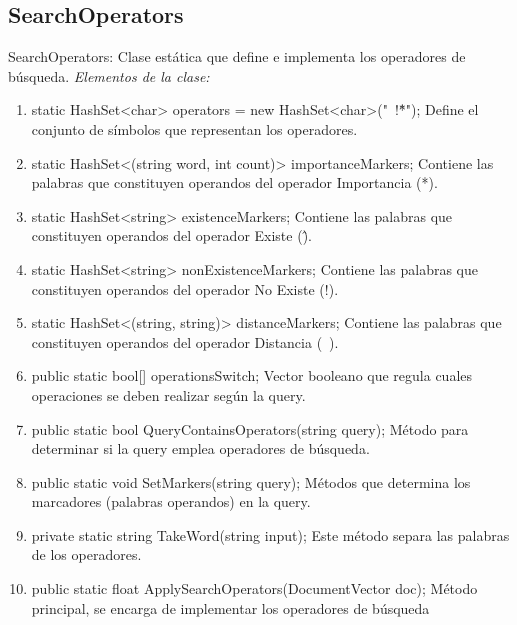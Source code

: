 \documentclass[a4paper,12pt]{article}
\begin{document}
\subsection{SearchOperators}
SearchOperators: Clase estática que define e implementa los operadores de
búsqueda.
\emph{Elementos de la clase:}
\begin{enumerate}
    \item static HashSet<char> operators = new HashSet<char>("~!\^*");
    Define el conjunto de símbolos que representan los operadores.
    \item static HashSet<(string word, int count)> importanceMarkers;
    Contiene las palabras que constituyen operandos del operador Importancia (*).
    \item static HashSet<string> existenceMarkers;
    Contiene las palabras que constituyen operandos del operador Existe (\^).
    \item static HashSet<string> nonExistenceMarkers;
     Contiene las palabras que constituyen operandos del operador No Existe (!).
     \item static HashSet<(string, string)> distanceMarkers;
    Contiene las palabras que constituyen operandos del operador Distancia (~).
    \item public static bool[] operationsSwitch;
    Vector booleano que regula cuales operaciones se deben realizar según la query.
    \item public static bool QueryContainsOperators(string query);
    Método para determinar si la query emplea operadores de búsqueda.
    \item public static void SetMarkers(string query);
    Métodos que determina los marcadores (palabras operandos) en la query.
    \item private static string TakeWord(string input);
    Este método separa las palabras de los operadores.
    \item public static float ApplySearchOperators(DocumentVector doc);
    Método principal, se encarga de implementar los operadores de búsqueda
\end{enumerate}
\end{document}
